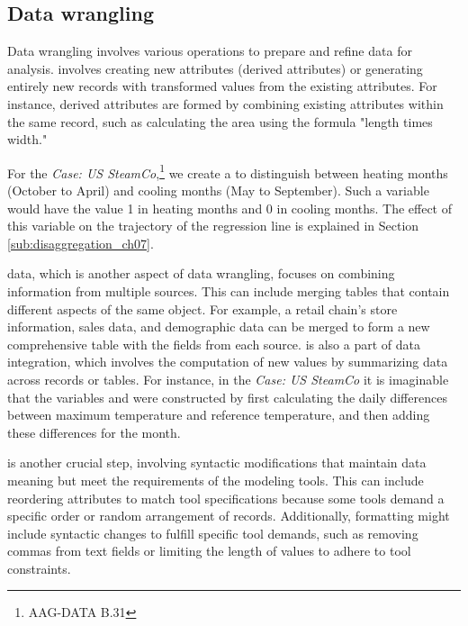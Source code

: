 
\subsection{Data wrangling} %
\label{sub:data_wrangling}

Data wrangling involves various operations to prepare and refine data for analysis.  involves creating new attributes (derived attributes) or generating entirely new records with transformed values from the existing attributes. For instance, derived attributes are formed by combining existing attributes within the same record, such as calculating the area using the formula "length times width."

For the \textit{Case: US SteamCo},\footnote{AAG-DATA B.31} we create a  to distinguish between heating months (October to April) and cooling months (May to September). 
Such a variable would have the value 1 in heating months and 0 in cooling months. 
The effect of this variable on the trajectory of the regression line is explained in Section \ref{sub:disaggregation_ch07}.

 data, which is another aspect of data wrangling, focuses on combining information from multiple sources. 
This can include merging tables that contain different aspects of the same object. For example, a retail chain's store information, sales data, and demographic data can be merged to form a new comprehensive table with the fields from each source. 
 is also a part of data integration, which involves the computation of new values by summarizing data across records or tables. 
For instance, in the \emph{Case: US SteamCo} it is imaginable that the variables  and  were constructed by first calculating the daily differences between maximum temperature and reference temperature, and then adding these differences for the month.

 is another crucial step, involving syntactic mod\-i\-fications that maintain data meaning but meet the requirements of the modeling tools. 
This can include reordering attributes to match tool specifications because some tools demand a specific order or random arrangement of records. 
Additionally, formatting might include syntactic changes to fulfill specific tool demands, such as removing commas from text fields or limiting the length of values to adhere to tool constraints.

